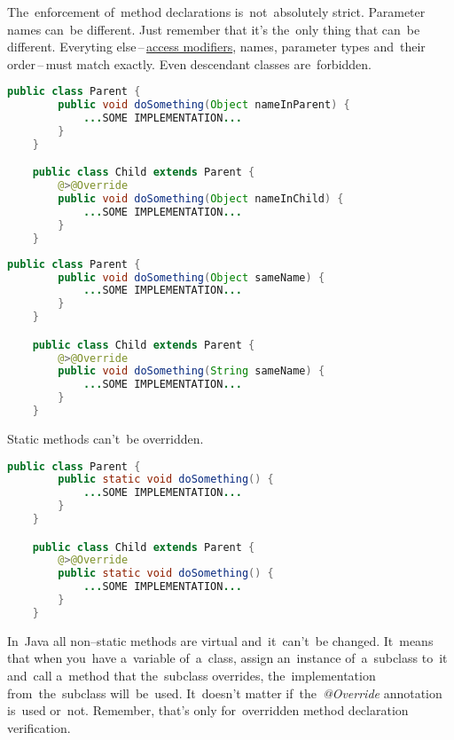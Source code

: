 \warning The~enforcement of~method declarations is~not~absolutely strict.
Parameter names can~be different.
Just remember that it's the~only thing that can~be different.
Everyting else\,--\,\hyperref[javaaccessmodifiers]{access modifiers}, names, parameter types and~their order\,--\,must match exactly.
Even descendant classes are~forbidden.

\begin{lstlisting}[language=Java]
    public class Parent {
        public void doSomething(Object nameInParent) {
            ...SOME IMPLEMENTATION...
        }
    }

    public class Child extends Parent {
        @>@Override
        public void doSomething(Object nameInChild) {
            ...SOME IMPLEMENTATION...
        }
    }
\end{lstlisting}

\begin{lstlisting}[language=Java]
    public class Parent {
        public void doSomething(Object sameName) {
            ...SOME IMPLEMENTATION...
        }
    }

    public class Child extends Parent {
        @>@Override
        public void doSomething(String sameName) {
            ...SOME IMPLEMENTATION...
        }
    }
\end{lstlisting}

\warning Static methods can't~be overridden.

\begin{lstlisting}[language=Java]
    public class Parent {
        public static void doSomething() {
            ...SOME IMPLEMENTATION...
        }
    }

    public class Child extends Parent {
        @>@Override
        public static void doSomething() {
            ...SOME IMPLEMENTATION...
        }
    }
\end{lstlisting}

\label{javavirtualmethods}
In~Java all non--static methods are virtual and~it~can't~be changed.
It~means that when you~have a~variable of~a~class, assign an~instance of~a~subclass to~it and~call a~method that the~subclass overrides, the~implementation from~the~subclass will~be~used.
It~doesn't matter if~the~\textit{@Override} annotation is~used or~not.
Remember, that's only for~overridden method declaration verification.

